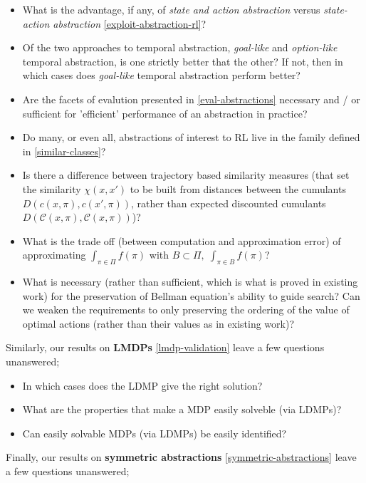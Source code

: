 \begin{itemize}
	\tightlist
	\item What is the advantage, if any, of \textit{state and action abstraction} versus \textit{state-action abstraction} \ref{exploit-abstraction-rl}?
	\item Of the two approaches to temporal abstraction, \textit{goal-like} and \textit{option-like} temporal abstraction, is one strictly better that the other? If not, then in which cases does \textit{goal-like} temporal abstraction perform better?
	\item Are the facets of evalution presented in \ref{eval-abstractions} necessary and / or sufficient for 'efficient' performance of an abstraction in practice?
	\item Do many, or even all, abstractions of interest to RL live in the family defined in \ref{similar-classes}?
	\item Is there a difference between trajectory based similarity measures (that set the similarity $\chi(x, x')$ to be built from distances between the cumulants $D(c(x, \pi), c(x', \pi))$, rather than expected discounted cumulants $D(\mathcal C(x, \pi), \mathcal C(x, \pi))$)?
	\item What is the trade off (between computation and approximation error) of approximating $\int_{\pi \in \Pi}f(\pi)$ with $B \subset \Pi, \; \int_{\pi \in B}f(\pi)$?
	\item What is necessary (rather than sufficient, which is what is proved in existing work) for the preservation of Bellman equation's ability to guide search? Can we weaken the requirements to only preserving the ordering of the value of optimal actions (rather than their values as in existing work)?
\end{itemize}

Similarly, our results on \textbf{LMDPs} \ref{lmdp-validation} leave a few questions unanswered;

\begin{itemize}
	\tightlist
	\item In which cases does the LDMP give the right solution?
	\item What are the properties that make a MDP easily solveble (via LDMPs)?
	\item Can easily solvable MDPs (via LDMPs) be easily identified?
\end{itemize}

Finally, our results on \textbf{symmetric abstractions} \ref{symmetric-abstractions} leave a few questions unanswered;

